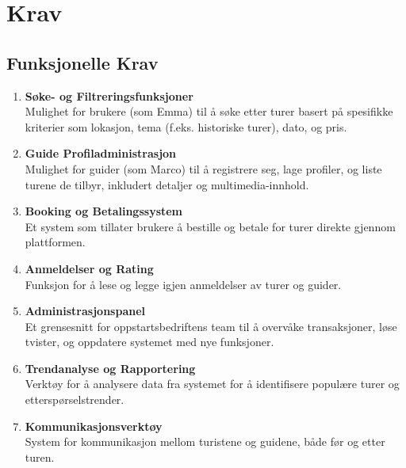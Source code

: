 \documentclass[../doc.tex]{subfiles}
\begin{document}
\section{Krav}
\subsection{Funksjonelle Krav}
\begin{enumerate}
    \item \textbf{Søke- og Filtreringsfunksjoner} \\
    Mulighet for brukere (som Emma) til å søke etter turer basert på spesifikke kriterier som lokasjon, tema (f.eks. historiske turer), dato, og pris.

    \item \textbf{Guide Profiladministrasjon} \\
    Mulighet for guider (som Marco) til å registrere seg, lage profiler, og liste turene de tilbyr, inkludert detaljer og multimedia-innhold.

    \item \textbf{Booking og Betalingssystem} \\
    Et system som tillater brukere å bestille og betale for turer direkte gjennom plattformen.

    \item \textbf{Anmeldelser og Rating} \\ 
    Funksjon for å lese og legge igjen anmeldelser av turer og guider.

    \item \textbf{Administrasjonspanel} \\
    Et grensesnitt for oppstartsbedriftens team til å overvåke transaksjoner, løse tvister, og oppdatere systemet med nye funksjoner.

    \item \textbf{Trendanalyse og Rapportering} \\
    Verktøy for å analysere data fra systemet for å identifisere populære turer og etterspørselstrender. 

    \item \textbf{Kommunikasjonsverktøy} \\
    System for kommunikasjon mellom turistene og guidene, både før og etter turen.
\end{enumerate}
\end{document}
